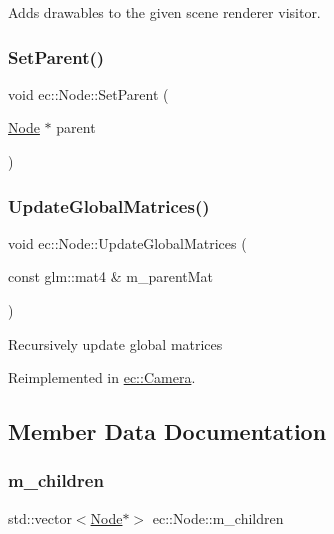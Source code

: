 Adds drawables to the given scene renderer visitor. \mbox{\label{classec_1_1_node_abda1732f28b0f81df2028d889eb73bdf}} 
\subsubsection{\texorpdfstring{Set\+Parent()}{SetParent()}}
{\footnotesize\ttfamily void ec\+::\+Node\+::\+Set\+Parent (\begin{DoxyParamCaption}\item[{\mbox{\hyperlink{classec_1_1_node}{Node}} $\ast$}]{parent }\end{DoxyParamCaption})}

\mbox{\label{classec_1_1_node_ac9970ec0ec03e130da59d0d5376a9855}} 
\subsubsection{\texorpdfstring{Update\+Global\+Matrices()}{UpdateGlobalMatrices()}}
{\footnotesize\ttfamily void ec\+::\+Node\+::\+Update\+Global\+Matrices (\begin{DoxyParamCaption}\item[{const glm\+::mat4 \&}]{m\+\_\+parent\+Mat }\end{DoxyParamCaption})\hspace{0.3cm}{\ttfamily [virtual]}}

Recursively update global matrices 

Reimplemented in \mbox{\hyperlink{classec_1_1_camera_abbdd88f9b352d34fef473064e2ccd625}{ec\+::\+Camera}}.



\subsection{Member Data Documentation}
\mbox{\label{classec_1_1_node_a648e1758013c7fc5899cbff2f8fe41fa}} 
\subsubsection{\texorpdfstring{m\+\_\+children}{m\_children}}
{\footnotesize\ttfamily std\+::vector$<$\mbox{\hyperlink{classec_1_1_node}{Node}}$\ast$$>$ ec\+::\+Node\+::m\+\_\+children\hspace{0.3cm}{\ttfamily [protected]}}

